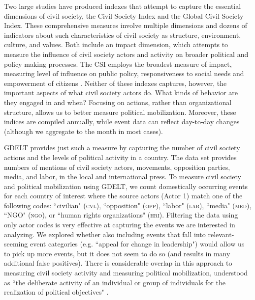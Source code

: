 \documentclass[10pt]{article}
\begin{document}
Two large studies have produced indexes that attempt to capture the essential dimensions of civil society, the Civil Society Index and the Global Civil Society Index.  These comprehensive measures involve multiple dimensions and dozens of indicators about such characteristics of civil society as structure, environment, culture, and values.  Both include an impact dimension, which attempts to measure the influence of civil society actors and activity on broader political and policy making processes.  The CSI employs the broadest measure of impact, measuring level of influence on public policy, responsiveness to social needs and empowerment of citizens \citep{malena2007can}.  Neither of these indexes captures, however, the important aspects of what civil society actors do.  What kinds of behavior are they engaged in and when?  Focusing on actions, rather than organizational structure, allows us to better measure political mobilization. Moreover, these indices are compiled annually, while event data can reflect day-to-day changes (although we aggregate to the month in most cases).

GDELT provides just such a measure by capturing the number of civil society actions and the levels of political activity in a country.  The data set provides numbers of mentions of civil society actors, movements, opposition parties, media, and labor,  in the local and international press. To measure civil society and political mobilization using GDELT, we count domestically occurring events for each country of interest where the source actors (Actor 1) match one of the following codes:  ``civilian" (\textsc{cvl}),  ``opposition" (\textsc{opp}), ``labor"  (\textsc{lab}),  ``media" (\textsc{med}), ``NGO" (\textsc{ngo}), or ``human rights organizations" (\textsc{hri}). Filtering the data using only actor codes is very effective at capturing the events we are interested in analyzing. We explored whether also including events that fall into relevant-seeming event categories (e.g. ``appeal for change in leadership") would allow us to pick up more events, but it does not seem to do so (and results in many additional false positives).  There is considerable overlap in this approach to measuring civil society activity and measuring political mobilization, understood as ``the deliberate activity of an individual or group of individuals for the realization of political objectives" \citep{politicalmobilization}.   
\end{document}
